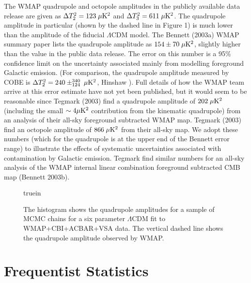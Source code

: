 The WMAP quadrupole and octopole amplitudes in the publicly available
data release are given as $\Delta T^2_2 = 123 \; \mu {\rm K}^2$ and
$\Delta T^2_3 = 611\; \mu {\rm K}^2$.  The quadrupole amplitude in
particular (shown by the dashed line in Figure 1) is much lower than
the amplitude of the fiducial $\Lambda$CDM model. The Bennett \etals
(2003a) WMAP summary paper lists the quadrupole amplitude as $154 \pm
70 \; \mu {\rm K}^2$, slightly higher than the value in the public
data release. The error on this number is a 95\% confidence limit on
the uncertainty associated mainly from modelling foreground Galactic
emission. (For comparison, the quadrupole amplitude measured by COBE
is $\Delta T^2_2 = 240\pm^{340}_{124}\; \mu {\rm K}^2$, Hinshaw ). Full details of how the WMAP team arrive at this error estimate
have not yet been published, but it would seem to be reasonable since
Tegmark \etals (2003) find a quadrupole amplitude of $202\; \mu {\rm
K}^2$ (including the small $\sim 4 \mk2$ contribution from the
kinematic quadrupole) from an analysis of their all-sky foreground
subtracted WMAP map. Tegmark \etals (2003) find an octopole amplitude
of $866 \; \mu {\rm K}^2$ from their all-sky map.  We adopt these
numbers (which for the quadrupole is at the upper end of the Bennett
\etals error range) to illustrate the effects of systematic
uncertainties associated with contamination by Galactic
emission. Tegmark \etals find similar numbers for an all-sky analysis
of the WMAP internal linear combination foreground subtracted CMB map
(Bennett \etals 2003b).




\begin{figure}


 truein


\caption
{The histogram shows the quadrupole amplitudes for a sample of MCMC
chains for a six parameter $\Lambda$CDM fit to WMAP+CBI+ACBAR+VSA
data. The vertical dashed line shows the quadrupole amplitude observed by
WMAP.}

\label{figure1}

\end{figure}


\section{Frequentist Statistics}




